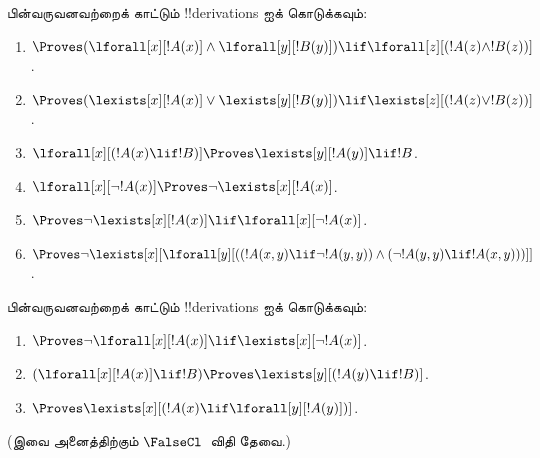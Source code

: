 \documentclass[../../../include/open-logic-section]{subfiles}
\begin{document}
\begin{prob}
பின்வருவனவற்றைக் காட்டும் !!{derivation}s ஐக் கொடுக்கவும்:
\begin{enumerate}
\item $\Proves (\lforall[x][!A(x)] \land \lforall[y][!B(y)]) \lif
\lforall[z][(!A(z) \land !B(z))]$.
\item $\Proves (\lexists[x][!A(x)] \lor \lexists[y][!B(y)]) \lif
\lexists[z][(!A(z) \lor !B(z))]$.
\item $\lforall[x][(!A(x) \lif !B)] \Proves \lexists[y][!A(y)] \lif !B$.
\item $\lforall[x][\lnot !A(x)] \Proves \lnot\lexists[x][!A(x)]$.
\item $\Proves \lnot\lexists[x][!A(x)] \lif \lforall[x][\lnot !A(x)]$.
\item $\Proves \lnot\lexists[x][\lforall[y][((!A(x,y) \lif \lnot
!A(y,y)) \land (\lnot !A(y,y) \lif !A(x,y)))]]$.
\end{enumerate}
\end{prob}

\begin{prob}
பின்வருவனவற்றைக் காட்டும் !!{derivation}s ஐக் கொடுக்கவும்:
\begin{enumerate}
\item $\Proves \lnot\lforall[x][!A(x)] \lif \lexists[x][\lnot!A(x)]$.
\item $(\lforall[x][!A(x)] \lif !B) \Proves \lexists[y][(!A(y) \lif !B)]$.
\item $\Proves \lexists[x][(!A(x) \lif \lforall[y][!A(y)])]$.
\end{enumerate}
(இவை அனைத்திற்கும் $\FalseCl$~விதி தேவை.)
\end{prob}
\end{document}
